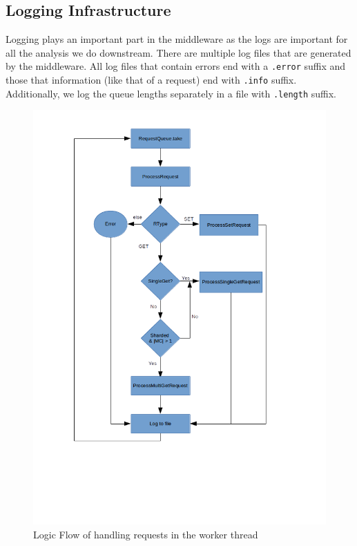 \documentclass[11pt,a4paper]{article}
\begin{document}
	\subsection{Logging Infrastructure}
	Logging plays an important part in the middleware as the logs are important for all the analysis we do downstream. There are multiple log files that are generated by the middleware. All log files that contain errors end with a \texttt{.error} suffix and those that information (like that of a request) end with \texttt{.info} suffix. Additionally, we log the queue lengths separately in a file with \texttt{.length} suffix.
	\begin{figure}[H]
		\caption{Logic Flow of handling requests in the worker thread}
		\centering
		\includegraphics[scale=0.9]{images/1_worker_logic_flow.png}
	\end{figure}
\end{document}
